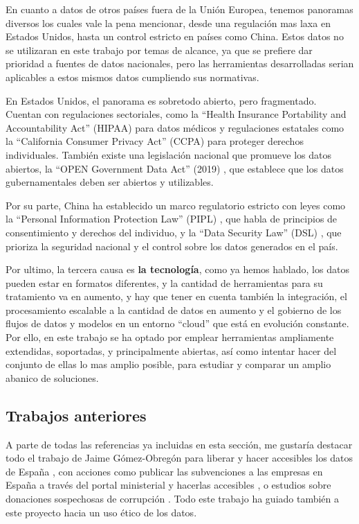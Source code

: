 En cuanto a datos de otros países fuera de la Unión Europea, tenemos panoramas diversos los cuales vale la pena mencionar, desde una regulación mas laxa en Estados Unidos, hasta un control estricto en países como China. Estos datos no se utilizaran en este trabajo por temas de alcance, ya que se prefiere dar prioridad a fuentes de datos nacionales, pero las herramientas desarrolladas serian aplicables a estos mismos datos cumpliendo sus normativas.

En Estados Unidos, el panorama es sobretodo abierto, pero fragmentado. Cuentan con regulaciones sectoriales, como la ``Health Insurance Portability and Accountability Act'' (HIPAA) para datos médicos \citep{webHIPAA1996EEUU} y regulaciones estatales como la ``California Consumer Privacy Act'' (CCPA) \citep{webCCPA2018California} para proteger derechos individuales. También existe una legislación nacional que promueve los datos abiertos, la ``OPEN Government Data Act'' (2019) \citep{webOGDA2019EEUU}, que establece que los datos gubernamentales deben ser abiertos y utilizables.

Por su parte, China ha establecido un marco regulatorio estricto con leyes como la ``Personal Information Protection Law'' (PIPL) \citep{webPIPL2021China}, que habla de principios de consentimiento y derechos del individuo, y la ``Data Security Law'' (DSL) \citep{webDSL2021China}, que prioriza la seguridad nacional y el control sobre los datos generados en el país.


Por ultimo, la tercera causa es \textbf{la tecnología}, como ya hemos hablado, los datos pueden estar en formatos diferentes, y la cantidad de herramientas para su tratamiento va en aumento, y hay que tener en cuenta también la integración, el procesamiento escalable a la cantidad de datos en aumento y el gobierno de los flujos de datos y modelos en un entorno ``cloud'' que está en evolución constante. Por ello, en este trabajo se ha optado por emplear herramientas ampliamente extendidas, soportadas, y principalmente abiertas, así como intentar hacer del conjunto de ellas lo mas amplio posible, para estudiar y comparar un amplio abanico de soluciones.


	\subsection{Trabajos anteriores}
	
	A parte de todas las referencias ya incluidas en esta sección, me gustaría destacar todo el trabajo de Jaime Gómez-Obregón para liberar y hacer accesibles los datos de España \citep{JaimeGomezObregon}, con acciones como publicar las subvenciones a las empresas en España a través del portal ministerial y hacerlas accesibles  \citep{JaimeGomezObregonSubvenciones}, o estudios sobre donaciones sospechosas de corrupción \citep{JaimeGomezObregonDonacion}. Todo este trabajo ha guiado también a este proyecto hacia un uso ético de los datos.
	
